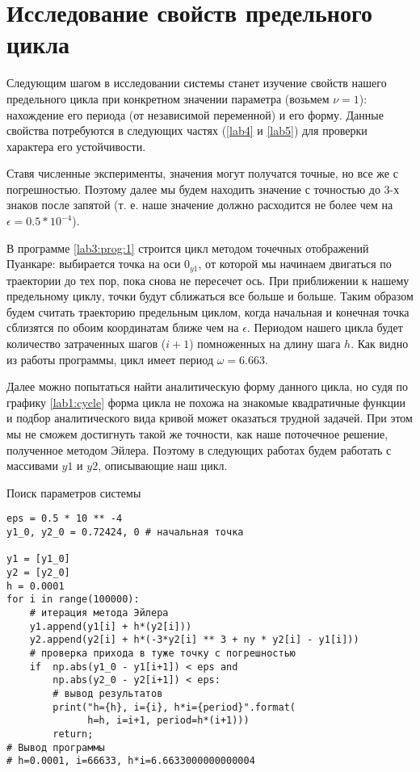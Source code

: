 \chapter{Исследование свойств предельного цикла}

Следующим шагом в исследовании системы станет изучение свойств нашего
предельного цикла при конкретном значении параметра (возьмем $\nu = 1$):
нахождение его периода (от независимой переменной) и его форму. Данные свойства
потребуются в следующих частях (\ref{lab4} и \ref{lab5}) для проверки
характера его устойчивости.

Ставя численные эксперименты, значения могут получатся точные, но все же с
погрешностью. Поэтому далее мы будем находить значение с точностью до 3-х знаков
после запятой (т. е. наше значение должно расходится не более чем на
$\epsilon = 0.5 * 10 ^{-4}$).

В программе \ref{lab3:prog:1} строится цикл методом точечных отображений Пуанкаре:
выбирается точка на оси $0_{y1}$, от которой мы начинаем двигаться по траектории
до тех пор, пока снова не пересечет ось. При приближении к нашему предельному
циклу, точки будут сближаться все больше и больше. Таким образом будем считать
траекторию предельным циклом, когда начальная и конечная точка сблизятся по
обоим координатам ближе чем на $\epsilon$. Периодом нашего цикла будет
количество затраченных шагов ($i + 1$) помноженных на длину шага $h$.
Как видно из работы программы, цикл имеет период $\omega = 6.663$.

Далее можно попытаться найти аналитическую форму данного цикла, но судя по
графику \ref{lab1:cycle} форма цикла не похожа на знакомые квадратичные функции и
подбор аналитического вида кривой может оказаться трудной задачей. При этом мы
не сможем достигнуть такой же точности, как наше поточечное решение, полученное
методом Эйлера. Поэтому в следующих работах будем работать с массивами $y1$ и
$y2$, описывающие наш цикл.

\begin{program}
    \caption{Поиск параметров системы}
    \label{lab3:prog:1}
    \begin{verbatim}
eps = 0.5 * 10 ** -4
y1_0, y2_0 = 0.72424, 0 # начальная точка

y1 = [y1_0]
y2 = [y2_0]
h = 0.0001
for i in range(100000):
    # итерация метода Эйлера
    y1.append(y1[i] + h*(y2[i]))
    y2.append(y2[i] + h*(-3*y2[i] ** 3 + ny * y2[i] - y1[i]))
    # проверка прихода в туже точку с погрешностью
    if  np.abs(y1_0 - y1[i+1]) < eps and
        np.abs(y2_0 - y2[i+1]) < eps:
        # вывод результатов
        print("h={h}, i={i}, h*i={period}".format(
              h=h, i=i+1, period=h*(i+1)))
        return;
# Вывод программы
# h=0.0001, i=66633, h*i=6.6633000000000004
    \end{verbatim}
\end{program}


